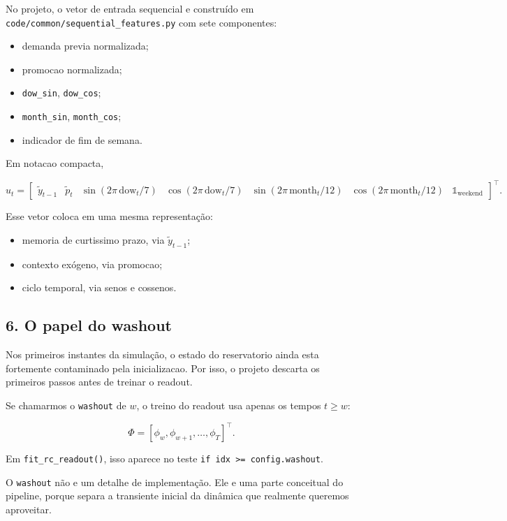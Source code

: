 \documentclass[12pt]{article}
\providecommand{\tightlist}{%
          \setlength{\itemsep}{0pt}\setlength{\parskip}{0pt}}
\begin{document}
No projeto, o vetor de entrada sequencial e construído em \texttt{code/common/sequential\_features.py} com sete componentes:

\begin{itemize}
\tightlist
\item
  demanda previa normalizada;
\item
  promocao normalizada;
\item
  \texttt{dow\_sin}, \texttt{dow\_cos};
\item
  \texttt{month\_sin}, \texttt{month\_cos};
\item
  indicador de fim de semana.
\end{itemize}

Em notacao compacta,

\[
u_t =
\begin{bmatrix}
\widetilde{y}_{t-1} &
\widetilde{p}_t &
\sin(2\pi \, \mathrm{dow}_t / 7) &
\cos(2\pi \, \mathrm{dow}_t / 7) &
\sin(2\pi \, \mathrm{month}_t / 12) &
\cos(2\pi \, \mathrm{month}_t / 12) &
\mathbb{1}_{\mathrm{weekend}}
\end{bmatrix}^\top.
\]

Esse vetor coloca em uma mesma representação:

\begin{itemize}
\tightlist
\item
  memoria de curtissimo prazo, via \(\widetilde{y}_{t-1}\);
\item
  contexto exógeno, via promocao;
\item
  ciclo temporal, via senos e cossenos.
\end{itemize}

\subsection{6. O papel do washout}\label{6-o-papel-do-washout}

Nos primeiros instantes da simulação, o estado do reservatorio ainda esta fortemente contaminado pela inicializacao. Por isso, o projeto descarta os primeiros passos antes de treinar o readout.

Se chamarmos o \texttt{washout} de \(w\), o treino do readout usa apenas os tempos \(t \ge w\):

\[
\Phi = [\phi_w, \phi_{w+1}, \dots, \phi_T]^\top.
\]

Em \texttt{fit\_rc\_readout()}, isso aparece no teste \texttt{if\ idx\ \textgreater{}=\ config.washout}.

O \texttt{washout} não e um detalhe de implementação. Ele e uma parte conceitual do pipeline, porque separa a transiente inicial da dinâmica que realmente queremos aproveitar.
\end{document}

